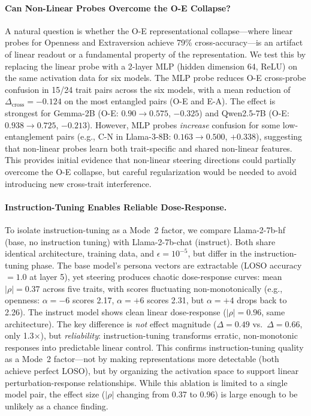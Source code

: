 \documentclass{article}
\begin{document}
\paragraph{Can Non-Linear Probes Overcome the O-E Collapse?}\label{sec:mlp_probe}
A natural question is whether the O-E representational collapse---where linear probes for Openness and Extraversion achieve 79\% cross-accuracy---is an artifact of linear readout or a fundamental property of the representation. We test this by replacing the linear probe with a 2-layer MLP (hidden dimension 64, ReLU) on the same activation data for six models. The MLP probe reduces O-E cross-probe confusion in 15/24 trait pairs across the six models, with a mean reduction of $\Delta_{\text{cross}}{=}{-}0.124$ on the most entangled pairs (O-E and E-A). The effect is strongest for Gemma-2B (O-E: $0.90 \to 0.575$, $-0.325$) and Qwen2.5-7B (O-E: $0.938 \to 0.725$, $-0.213$). However, MLP probes \emph{increase} confusion for some low-entanglement pairs (e.g., C-N in Llama-3-8B: $0.163 \to 0.500$, $+0.338$), suggesting that non-linear probes learn both trait-specific and shared non-linear features. This provides initial evidence that non-linear steering directions could partially overcome the O-E collapse, but careful regularization would be needed to avoid introducing new cross-trait interference.

\paragraph{Instruction-Tuning Enables Reliable Dose-Response.}\label{sec:instruction_ablation}
To isolate instruction-tuning as a Mode~2 factor, we compare Llama-2-7b-hf (base, no instruction tuning) with Llama-2-7b-chat (instruct). Both share identical architecture, training data, and $\epsilon{=}10^{-5}$, but differ in the instruction-tuning phase. The base model's persona vectors are extractable (LOSO accuracy ${=}1.0$ at layer 5), yet steering produces chaotic dose-response curves: mean $|\rho|{=}0.37$ across five traits, with scores fluctuating non-monotonically (e.g., openness: $\alpha{=}{-}6$ scores 2.17, $\alpha{=}{+}6$ scores 2.31, but $\alpha{=}{+}4$ drops back to 2.26). The instruct model shows clean linear dose-response ($|\rho|{=}0.96$, same architecture). The key difference is \emph{not} effect magnitude ($\Delta{=}0.49$ vs.\ $\Delta{=}0.66$, only 1.3$\times$), but \emph{reliability}: instruction-tuning transforms erratic, non-monotonic responses into predictable linear control. This confirms instruction-tuning quality as a Mode~2 factor---not by making representations more detectable (both achieve perfect LOSO), but by organizing the activation space to support linear perturbation-response relationships. While this ablation is limited to a single model pair, the effect size ($|\rho|$ changing from 0.37 to 0.96) is large enough to be unlikely as a chance finding.
\end{document}
